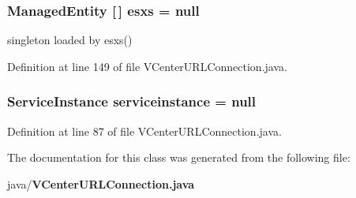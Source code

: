 \subsubsection[{esxs}]{\setlength{\rightskip}{0pt plus 5cm}Managed\+Entity [$\,$] esxs = null\hspace{0.3cm}{\ttfamily [protected]}}\label{classorg_1_1smallfoot_1_1parser_1_1vmware_1_1VCenterURLConnection_a33f211087f486d6a140a235e1218c93c}


singleton loaded by esxs() 



Definition at line 149 of file V\+Center\+U\+R\+L\+Connection.\+java.

\subsubsection[{serviceinstance}]{\setlength{\rightskip}{0pt plus 5cm}Service\+Instance serviceinstance = null\hspace{0.3cm}{\ttfamily [protected]}}\label{classorg_1_1smallfoot_1_1parser_1_1vmware_1_1VCenterURLConnection_a0766f2c999f41d3990f184648d52ff57}


Definition at line 87 of file V\+Center\+U\+R\+L\+Connection.\+java.



The documentation for this class was generated from the following file\+:\begin{DoxyCompactItemize}
\item 
java/{\bf V\+Center\+U\+R\+L\+Connection.\+java}\end{DoxyCompactItemize}
